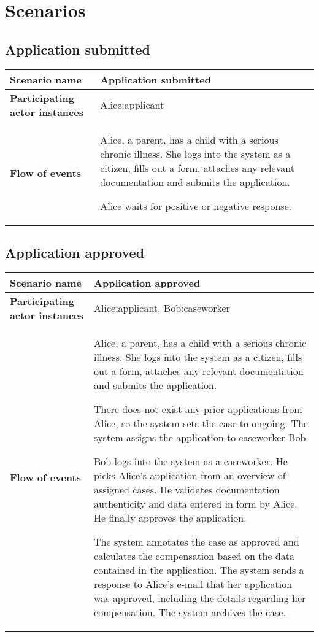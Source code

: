 \newpage
\section{Scenarios}

\subsection*{Application submitted}
\begin{table}[htb!]
\begin{tabularx}{\textwidth}{l|X}
	\textbf{Scenario name} & Application submitted \\
	\hline
	\textbf{Participating actor instances} & Alice:applicant\\
	\hline
	\textbf{Flow of events} &
	\begin{compactenum}
		\item Alice, a parent, has a child with a serious chronic illness. She logs into the system as a citizen, fills out a form, attaches any relevant documentation and submits the application.
		\item Alice waits for positive or negative response.
    \end{compactenum}\\
	\hline
\end{tabularx}
\end{table}

\subsection*{Application approved}
\begin{table}[htb!]
\begin{tabularx}{\textwidth}{l|X}
	\textbf{Scenario name} & Application approved \\
	\hline
	\textbf{Participating actor instances} & Alice:applicant, Bob:caseworker\\
	\hline
	\textbf{Flow of events} &
	\begin{compactenum}
			\item Alice, a parent, has a child with a serious chronic illness. She logs into the system as a citizen, fills out a form, attaches any relevant documentation and submits the application.
			\item There does not exist any prior applications from Alice, so the system sets the case to ongoing. The system assigns the application to caseworker Bob.
			\item Bob logs into the system as a caseworker. He picks Alice's application from an overview of assigned cases. He validates documentation authenticity and data entered in form by Alice. He finally approves the application.
			\item The system annotates the case as approved and calculates the compensation based on the data contained in the application. The system sends a response to Alice's e-mail that her application was approved, including the details regarding her compensation. The system archives the case.
    \end{compactenum}\\
	\hline
\end{tabularx}
\end{table}

